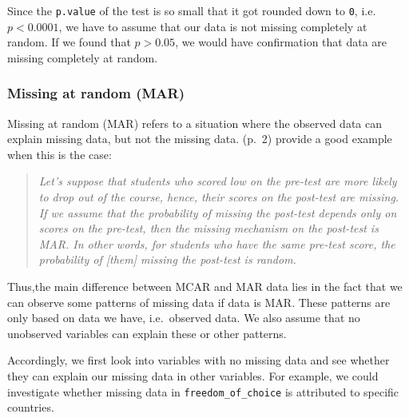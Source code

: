 \documentclass[
]{book}
\begin{document}
Since the \texttt{p.value} of the test is so small that it got rounded down to \texttt{0}, i.e.~\(p<0.0001\), we have to assume that our data is not missing completely at random. If we found that \(p>0.05\), we would have confirmation that data are missing completely at random.

\hypertarget{missing-at-random-mar}{%
\subsubsection{Missing at random (MAR)}\label{missing-at-random-mar}}

Missing at random (MAR) refers to a situation where the observed data can explain missing data, but not the missing data. \citet{dong-et-al-2013} (p.~2) provide a good example when this is the case:

\begin{quote}
\emph{Let's suppose that students who scored low on the pre-test are more likely to drop out of the course, hence, their scores on the post-test are missing. If we assume that the probability of missing the post-test depends only on scores on the pre-test, then the missing mechanism on the post-test is MAR. In other words, for students who have the same pre-test score, the probability of {[}them{]} missing the post-test is random.}
\end{quote}

Thus,the main difference between MCAR and MAR data lies in the fact that we can observe some patterns of missing data if data is MAR. These patterns are only based on data we have, i.e.~observed data. We also assume that no unobserved variables can explain these or other patterns.

Accordingly, we first look into variables with no missing data and see whether they can explain our missing data in other variables. For example, we could investigate whether missing data in \texttt{freedom\_of\_choice} is attributed to specific countries.
\end{document}
